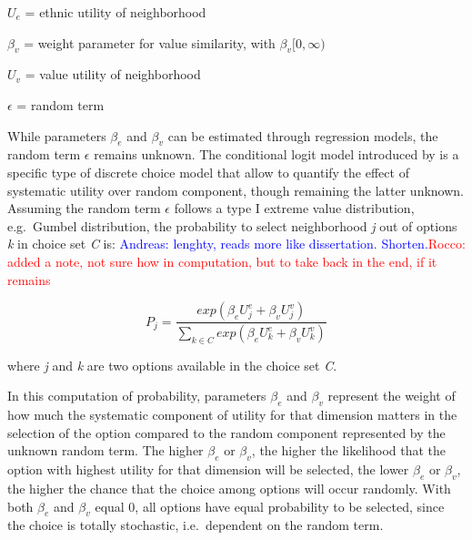 \documentclass[
]{article}
\begin{document}
\par

\(U_e\) = ethnic utility of neighborhood

\par

\(\beta_v\) = weight parameter for value similarity, with
\(\beta_v [0, \infty)\)

\par

\(U_v\) = value utility of neighborhood

\par

\(\epsilon\) = random term

\par

While parameters \(\beta_e\) and \(\beta_v\) can be estimated through
regression models, the random term \(\epsilon\) remains unknown. The
conditional logit model introduced by \cite{mcfadden1973conditional} is
a specific type of discrete choice model that allow to quantify the
effect of systematic utility over random component, though remaining the
latter unknown. Assuming the random term \(\epsilon\) follows a type I
extreme value distribution, e.g.~Gumbel distribution, the probability to
select neighborhood \textit{j} out of options \textit{k} in choice set
\textit{C} is:
\textcolor{blue}{{Andreas: }lenghty, reads more like dissertation. Shorten.}{\textcolor{red}{Rocco: added a note, not sure how in computation, but to take back in the end, if it remains}}

\begin{equation}
P_{j} = \frac{exp(\beta_e U^e_j + \beta_v U^v_j)}{\sum\limits_{{k\in{C}}}exp(\beta_e U^e_k + \beta_v U^v_k)}
\label{eq:cndtnl}
\end{equation}

where \textit{j} and \textit{k} are two options available in the choice
set \textit{C}.

\par
\par

In this computation of probability, parameters \(\beta_e\) and
\(\beta_v\) represent the weight of how much the systematic component of
utility for that dimension matters in the selection of the option
compared to the random component represented by the unknown random term.
The higher \(\beta_e\) or \(\beta_v\), the higher the likelihood that
the option with highest utility for that dimension will be selected, the
lower \(\beta_e\) or \(\beta_v\), the higher the chance that the choice
among options will occur randomly. With both \(\beta_e\) and \(\beta_v\)
equal 0, all options have equal probability to be selected, since the
choice is totally stochastic, i.e.~dependent on the random term.
\end{document}

